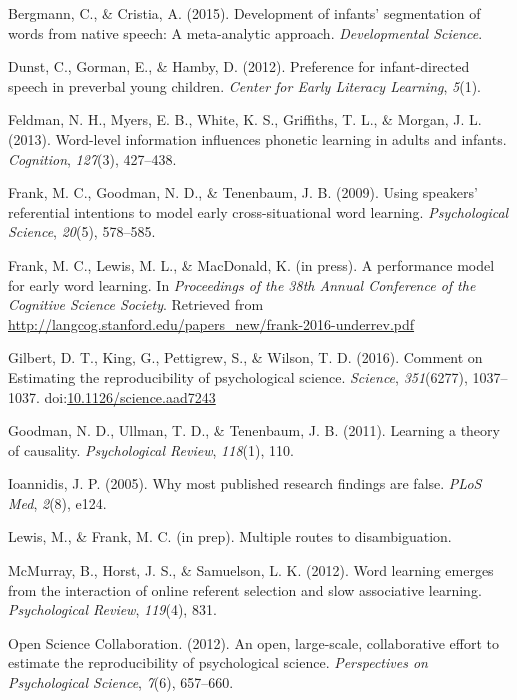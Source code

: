 \documentclass[english,floatsintext,man]{apa6}
\begin{document}
\hypertarget{ref-bergmann2015development}{}
Bergmann, C., \& Cristia, A. (2015). Development of infants'
segmentation of words from native speech: A meta-analytic approach.
\emph{Developmental Science}.

\hypertarget{ref-dunst2012preference}{}
Dunst, C., Gorman, E., \& Hamby, D. (2012). Preference for
infant-directed speech in preverbal young children. \emph{Center for
Early Literacy Learning}, \emph{5}(1).

\hypertarget{ref-feldman2013word}{}
Feldman, N. H., Myers, E. B., White, K. S., Griffiths, T. L., \& Morgan,
J. L. (2013). Word-level information influences phonetic learning in
adults and infants. \emph{Cognition}, \emph{127}(3), 427--438.

\hypertarget{ref-frank2009using}{}
Frank, M. C., Goodman, N. D., \& Tenenbaum, J. B. (2009). Using
speakers' referential intentions to model early cross-situational word
learning. \emph{Psychological Science}, \emph{20}(5), 578--585.

\hypertarget{ref-frank2016performance}{}
Frank, M. C., Lewis, M. L., \& MacDonald, K. (in press). A performance
model for early word learning. In \emph{Proceedings of the 38th Annual
Conference of the Cognitive Science Society}. Retrieved from
\url{http://langcog.stanford.edu/papers_new/frank-2016-underrev.pdf}

\hypertarget{ref-Gilbert1037}{}
Gilbert, D. T., King, G., Pettigrew, S., \& Wilson, T. D. (2016).
Comment on Estimating the reproducibility of psychological science.
\emph{Science}, \emph{351}(6277), 1037--1037.
doi:\href{https://doi.org/10.1126/science.aad7243}{10.1126/science.aad7243}

\hypertarget{ref-goodman2011learning}{}
Goodman, N. D., Ullman, T. D., \& Tenenbaum, J. B. (2011). Learning a
theory of causality. \emph{Psychological Review}, \emph{118}(1), 110.

\hypertarget{ref-ioannidis2005most}{}
Ioannidis, J. P. (2005). Why most published research findings are false.
\emph{PLoS Med}, \emph{2}(8), e124.

\hypertarget{ref-lfprep}{}
Lewis, M., \& Frank, M. C. (in prep). Multiple routes to disambiguation.

\hypertarget{ref-mcmurray2012word}{}
McMurray, B., Horst, J. S., \& Samuelson, L. K. (2012). Word learning
emerges from the interaction of online referent selection and slow
associative learning. \emph{Psychological Review}, \emph{119}(4), 831.

\hypertarget{ref-open2012open}{}
Open Science Collaboration. (2012). An open, large-scale, collaborative
effort to estimate the reproducibility of psychological science.
\emph{Perspectives on Psychological Science}, \emph{7}(6), 657--660.
\end{document}
